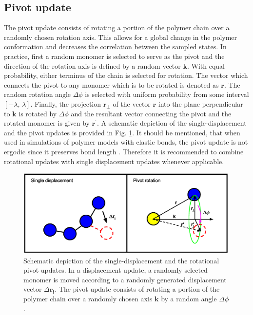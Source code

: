 \documentclass[12pt]{report}
\begin{document}
\subsection{Pivot update}
The pivot update consists of rotating a portion of the polymer chain over a randomly chosen rotation axis. This allows for a global change in the polymer conformation and decreases the correlation between the sampled states. In practice, first a random monomer is selected to serve as the pivot and the direction of the rotation axis is defined by a random vector $\mathbf{k}$. With equal probability, either terminus of the chain is selected for rotation. The vector which connects the pivot to any monomer which is to be rotated is denoted as $\mathbf{r}$. The random rotation angle $\Delta \phi$ is selected with uniform probability from some interval $[-\lambda,\,\lambda]$. Finally, the projection $\mathbf{r}_{\bot}$ of the vector $\mathbf{r}$ into the plane perpendicular to $\mathbf{k}$ is rotated by $\Delta \phi$ and the resultant vector connecting the pivot and the rotated monomer is given by $\mathbf{r}^{\prime}$. A schematic depiction of the single-displacement and the pivot updates is provided in Fig. \ref{fig:conformUpdate}. It should be mentioned, that when used in simulations of polymer models with elastic bonds, the pivot update is not ergodic since it preserves bond length \cite{Bachmann2014}. Therefore it is recommended to combine rotational updates with single displacement updates whenever applicable. 

%
\begin{figure}
\center
\includegraphics[width = 0.99\textwidth]{chapter3Figs/conformationalUpdates.eps}
\caption{\label{fig:conformUpdate}%
Schematic depiction of the single-displacement and the rotational pivot updates.
In a displacement update, a randomly selected monomer is moved according to a randomly generated displacement vector $\Delta \mathbf{r_{i}}$. The pivot update consists of rotating a portion of the polymer chain over a randomly chosen axis $\mathbf{k}$ by a random angle $\Delta \phi$. 
}
\end{figure}
% 
\end{document}
